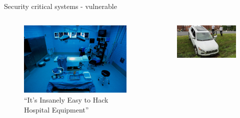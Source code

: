 \documentclass[xcolor={x11names}]{beamer}
\begin{document}
\begin{frame}{Security critical systems - vulnerable}
    \begin{columns}
        \begin{column}{0.5\textwidth}
            \begin{figure}
                \centering
                \includegraphics[height=.3\textheight]{figures/hospital-hacking.jpg}
                \caption{``It's Insanely Easy to Hack Hospital Equipment'' \cite{zetter_its_2014}}
                \label{hack_hospital}
            \end{figure}
        \end{column}
        \begin{column}{0.5\textwidth}
            \begin{figure}
                \centering
                \includegraphics[height=.3\textheight]{figures/jeep_offroad.jpg}

\end{figure}
\end{column}
\end{columns}
\end{frame}
\end{document}
